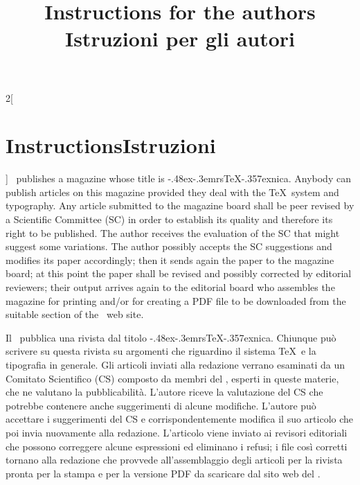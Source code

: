 \documentclass[12pt]{article}
\DeclareRobustCommand*{\Ars}{\textsf{\lower -.48ex\hbox{\rotatebox{-20}{A}}\kern -.3em{rs}}\discretionary{-}{}{\kern -.05em}\TeX\discretionary{-}{}{\kern -.17em}\lower -.357ex\hbox{nica}}
\providecommand\italian{\selectlanguage{italian}}
\providecommand\english{\selectlanguage{english}}
\begin{document}
\author{}

\title{\parbox{0.6\textwidth}{\centering\bfseries 
Instructions for the authors\newline 
{\italian Istruzioni per gli autori}}}

\date{}

\maketitle


\begin{paracol}{2}[\section{Instructions\hspace{5.6em}Istruzioni}]\english{}
\GuIT\ publishes a magazine whose title is \Ars. Anybody can publish articles on this magazine provided they deal with the \TeX\ system and typography. Any article submitted to the magazine board shall be peer revised by a Scientific Committee (SC) in order to establish its quality and therefore its right to be published. The author receives the evaluation of the SC that might suggest some variations. The author possibly accepts the SC suggestions and modifies its paper accordingly; then it sends again the paper to the magazine board; at this point the paper shall be revised  and possibly corrected by editorial reviewers; their output arrives again to the editorial board who assembles the magazine for printing and/or for creating a PDF file to be downloaded from the suitable section of the \GuIT\ web site.

\switchcolumn\italian{}

Il \GuIT\ pubblica una rivista dal titolo \Ars. Chiunque può scrivere su questa rivista su argomenti che riguardino il sistema \TeX\ e la tipografia in generale. Gli articoli inviati alla redazione verrano esaminati da un Comitato Scientifico (CS) composto da membri del \GuIT, esperti in queste materie, che ne valutano la pubblicabilità. L'autore riceve la valutazione del CS che potrebbe contenere anche suggerimenti di alcune modifiche. L'autore può accettare i suggerimenti del CS e corrispondentemente modifica il suo articolo che poi invia nuovamente alla redazione. L'articolo viene inviato ai revisori editoriali che possono correggere alcune espressioni ed eliminano i refusi; i file così corretti tornano alla redazione che provvede all'assemblaggio degli articoli per la rivista pronta per la stampa e per la versione PDF da scaricare dal sito web del \GuIT.


\end{paracol}
\end{document}
